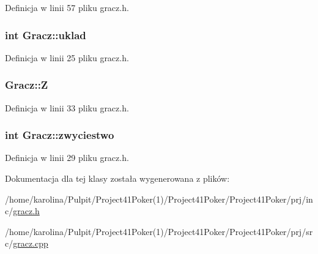 Definicja w linii 57 pliku gracz.\-h.

\hypertarget{class_gracz_a3d23530d268c7825833e48b0f613266f}{
\subsubsection[{uklad}]{\setlength{\rightskip}{0pt plus 5cm}int Gracz\-::uklad}}\label{class_gracz_a3d23530d268c7825833e48b0f613266f}


Definicja w linii 25 pliku gracz.\-h.

\hypertarget{class_gracz_a958307f187f423a0b1f4fe458af46d90}{
\subsubsection[{Z}]{ Gracz\-::\-Z}}\label{class_gracz_a958307f187f423a0b1f4fe458af46d90}


Definicja w linii 33 pliku gracz.\-h.

\hypertarget{class_gracz_a56490a4d67a3f6950b322c7a1b8c7a30}{
\subsubsection[{zwyciestwo}]{\setlength{\rightskip}{0pt plus 5cm}int Gracz\-::zwyciestwo}}\label{class_gracz_a56490a4d67a3f6950b322c7a1b8c7a30}


Definicja w linii 29 pliku gracz.\-h.



Dokumentacja dla tej klasy została wygenerowana z plików\-:\begin{DoxyCompactItemize}
\item 
/home/karolina/\-Pulpit/\-Project41\-Poker(1)/\-Project41\-Poker/\-Project41\-Poker/prj/inc/\hyperlink{gracz_8h}{gracz.\-h}\item 
/home/karolina/\-Pulpit/\-Project41\-Poker(1)/\-Project41\-Poker/\-Project41\-Poker/prj/src/\hyperlink{gracz_8cpp}{gracz.\-cpp}\end{DoxyCompactItemize}

